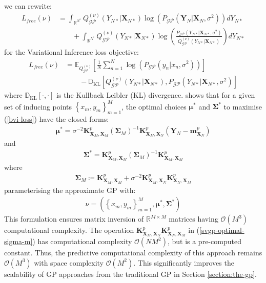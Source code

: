 \documentclass{article}
\newcommand{\KLD}{\operatorname{\mathbb{D}_{KL}}}
\newcommand{\GP}{\operatorname{\mathcal{GP}}}
\numberwithin{equation}{section}
\begin{document}
we can rewrite:
\begin{align}
    L_{free}(\nu) &= \int_{\mathbb{R}^{N^*}} Q^{(\nu)}_{\GP}(Y_{N*} \vert \mathbf{X}_{N*}) \log \left(P_{\GP}\left(\mathbf{Y}_N \vert \mathbf{X}_{N}, \sigma^2\right)\right) d Y_{N*} \nonumber
    \\ & \qquad + \int_{\mathbb{R}^{N^*}} Q^{(\nu)}_{\GP}(Y_{N*} \vert \mathbf{X}_{N*}) \log \left(\frac{P_{\GP}\left( Y_{N*} \vert \mathbf{X}_{N*}, \sigma^2\right) }{Q^{(\nu)}_{\GP}\left(Y_{N*} \vert \mathbf{X}_{N*}\right)}\right) d Y_{N*}
    \label{elbo-broken-down}
\end{align}
for the Variational Inference loss objective:
\begin{align}
    \label{bvi-loss}
    L_{free}(\nu) &=\mathbb{E}_{Q^{(\nu)}_{\GP}}\left[\frac{1}{N}\sum_{n=1}^N\log \left(P_{\GP}\left(y_n \vert x_n, \sigma^2\right)\right)\right] \nonumber \\
    & \qquad - \KLD \left[Q^{(\nu)}_{\GP}\left(Y_{N*} \vert \mathbf{X}_{N*}\right), P_{\GP}\left( Y_{N*} \vert \mathbf{X}_{N*}, \sigma^2\right) \right]
    \label{bvi-loss}
\end{align}
where $\KLD[\cdot, \cdot]$ is the Kullback Leibler (KL) divergence.
\cite{titsias2009variational} shows that for a given set of inducing points $\left\{ x_m, y_m\right\}_{m=1}^M$, the optimal choices $\boldsymbol{\mu}^*$ and $\mathbf{\Sigma}^*$ to maximise (\ref{bvi-loss}) have the closed forms:
\begin{align}
    \label{svgp-optimal-mean}
    \boldsymbol{\mu}^* = \sigma^{-2}\mathbf{K}^p_{\mathbf{X}_M, \mathbf{X}_M}  \left(\mathbf{\Sigma}_M\right)^{-1}\mathbf{K}^p_{\mathbf{X}_M, \mathbf{X}_N}  \left(\mathbf{Y}_N - \mathbf{m}^p_{\mathbf{X}_N}\right)
\end{align}
and
\begin{align}
    \label{svgp-optimal-covariance}
    \mathbf{\Sigma}^* = \mathbf{K}^p_{\mathbf{X}_M, \mathbf{X}_M}  \left(\mathbf{\Sigma}_M\right)^{-1}\mathbf{K}^p_{\mathbf{X}_M, \mathbf{X}_M} 
\end{align}
where 
\begin{align}
    \mathbf{\Sigma}_M \coloneqq \mathbf{K}^p_{\mathbf{X}_M, \mathbf{X}_M}  + \sigma^{-2}\mathbf{K}^p_{\mathbf{X}_M, \mathbf{X}_N} \mathbf{K}^p_{\mathbf{X}_N, \mathbf{X}_M} 
    \label{svgp-optimal-sigma-m}
\end{align}
parameterising the approximate GP with:
\begin{align}
    \nu = \left( \left\{ x_m, y_m\right\}_{m=1}^M, \boldsymbol{\mu}^*, \mathbf{\Sigma}^*\right)
    \label{titsias-svgp-parameters}
\end{align}
This formulation ensures matrix inversion of $\mathbb{R}^{M \times M}$ matrices having $\mathcal{O}\left(M^3\right)$ computational complexity. The operation $\mathbf{K}^p_{\mathbf{X}_M, \mathbf{X}_N} \mathbf{K}^p_{\mathbf{X}_N, \mathbf{X}_M} $ in (\ref{svgp-optimal-sigma-m}) has computational complexity $\mathcal{O}\left(NM^2\right)$, but is a pre-computed constant. Thus, the predictive computational complexity of this approach remains $\mathcal{O}\left(M^3\right)$ with space complexity $\mathcal{O}\left(M^2\right)$. This significantly improves the scalability of GP approaches from the traditional GP in Section \ref{section:the-gp}.
\end{document}
